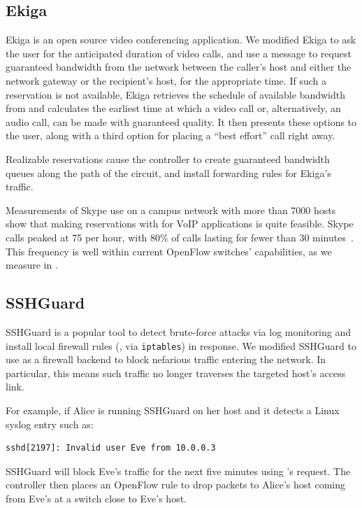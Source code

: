 \subsection{Ekiga}

Ekiga is an open source video conferencing application. %
We modified Ekiga to ask the user for the anticipated duration of
video calls,
and use a  message to request guaranteed bandwidth
from the network between the caller's host and either the network
gateway or the recipient's host, for the appropriate time. If such a
reservation is not available, Ekiga retrieves the schedule of
available bandwidth from \sys and calculates the earliest time at
which a video call or, alternatively, an audio call, can be made
with guaranteed quality. It then presents these options to the
user, along with a third option for placing a ``best effort'' call
right away.

Realizable reservations cause the \sys controller to create
guaranteed bandwidth queues along the path of the circuit, and
install forwarding rules for Ekiga's traffic.

Measurements of Skype use on a campus network with more than 7000
hosts show that making reservations with \sys for VoIP applications
is quite feasible. Skype calls peaked at 75 per hour, with 80\% of
calls lasting for fewer than 30 minutes~\cite{SkypeTraffic}.  This
frequency is well within current OpenFlow switches' capabilities, as
we measure in .\\

\subsection{SSHGuard}
\label{sec:sshguard}

SSHGuard is a popular tool to detect brute-force attacks via log monitoring
and install local firewall rules (\eg, via \verb/iptables/)
in response. We modified SSHGuard to use
\sys as a firewall backend to block nefarious traffic entering
the network. In particular, this means such traffic no longer traverses the
targeted host's access link.

For example, if Alice is running SSHGuard on her host and
it detects a Linux syslog entry such as:

\begin{small}
\begin{verbatim}
sshd[2197]: Invalid user Eve from 10.0.0.3
\end{verbatim}
\end{small}
%
SSHGuard will block Eve's traffic for the next five minutes using
\sys's  request. The \sys controller then places an
OpenFlow rule to drop packets to Alice's host coming from Eve's at a
switch close to Eve's host.

